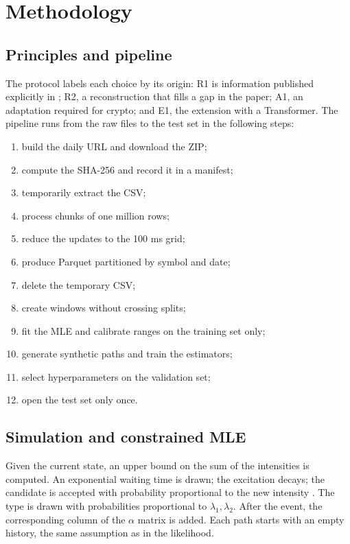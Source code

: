 \chapter{Methodology}

\section{Principles and pipeline}

The protocol labels each choice by its origin: R1 is information published explicitly in
\citet{lee2023}; R2, a reconstruction that fills a gap in the paper; A1, an adaptation
required for crypto; and E1, the extension with a Transformer. The pipeline runs from the raw
files to the test set in the following steps:
\begin{enumerate}
  \item build the daily URL and download the ZIP;
  \item compute the SHA-256 and record it in a manifest;
  \item temporarily extract the CSV;
  \item process chunks of one million rows;
  \item reduce the updates to the 100 ms grid;
  \item produce Parquet partitioned by symbol and date;
  \item delete the temporary CSV;
  \item create windows without crossing splits;
  \item fit the MLE and calibrate ranges on the training set only;
  \item generate synthetic paths and train the estimators;
  \item select hyperparameters on the validation set;
  \item open the test set only once.
\end{enumerate}

\section{Simulation and constrained MLE}
\label{sec:sim-thinning}

Given the current state, an upper bound on the sum of the intensities is computed. An
exponential waiting time is drawn; the excitation decays; the candidate is accepted
with probability proportional to the new intensity \citep{ogata1981}. The type is
drawn with probabilities proportional to \(\lambda_1,\lambda_2\). After the event, the
corresponding column of the \(\alpha\) matrix is added. Each path starts with an
empty history, the same assumption as in the likelihood.

